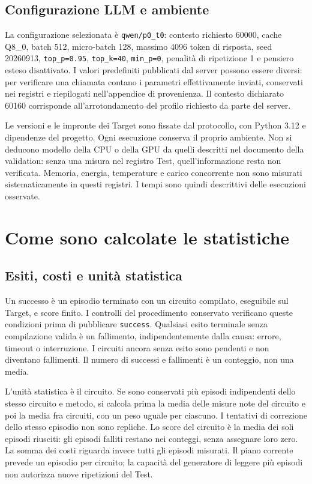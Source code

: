 \subsection{Configurazione LLM e ambiente}
La configurazione selezionata è \texttt{qwen/p0\_t0}: contesto richiesto 60000,
cache Q8\_0, batch 512, micro-batch 128, massimo 4096 token di risposta,
seed 20260913, \texttt{top\_p=0.95}, \texttt{top\_k=40}, \texttt{min\_p=0},
penalità di ripetizione 1 e pensiero esteso disattivato. I valori predefiniti
pubblicati dal server possono essere diversi: per verificare una chiamata
contano i parametri effettivamente inviati, conservati nei registri e riepilogati
nell'appendice di provenienza. Il contesto dichiarato 60160 corrisponde
all'arrotondamento del profilo richiesto da parte del server.

Le versioni e le impronte dei Target sono fissate dal protocollo, con Python 3.12
e dipendenze del progetto. Ogni esecuzione conserva il proprio ambiente.
Non si deducono modello della CPU o della GPU da quelli descritti nel documento
della validation: senza una misura nel registro Test, quell'informazione resta
non verificata. Memoria, energia, temperature e carico concorrente non sono
misurati sistematicamente in questi registri. I tempi sono quindi descrittivi
delle esecuzioni osservate.
\section{Come sono calcolate le statistiche}
\subsection{Esiti, costi e unità statistica}
Un successo è un episodio terminato con un circuito compilato, eseguibile sul
Target, e score finito. I controlli del procedimento conservato verificano queste
condizioni prima di pubblicare \texttt{success}. Qualsiasi esito terminale senza
compilazione valida è un fallimento, indipendentemente dalla causa: errore,
timeout o interruzione. I circuiti ancora senza esito sono pendenti e non diventano
fallimenti. Il numero di successi e fallimenti è un conteggio, non una media.

L'unità statistica è il circuito. Se sono conservati più episodi indipendenti
dello stesso circuito e metodo, si calcola prima la media delle misure note del
circuito e poi la media fra circuiti, con un peso uguale per ciascuno. I tentativi
di correzione dello stesso episodio non sono repliche. Lo score del circuito è
la media dei soli episodi riusciti: gli episodi falliti restano nei conteggi,
senza assegnare loro zero. La somma dei costi riguarda invece tutti gli episodi
misurati. Il piano corrente prevede un episodio per circuito; la capacità del
generatore di leggere più episodi non autorizza nuove ripetizioni del Test.

